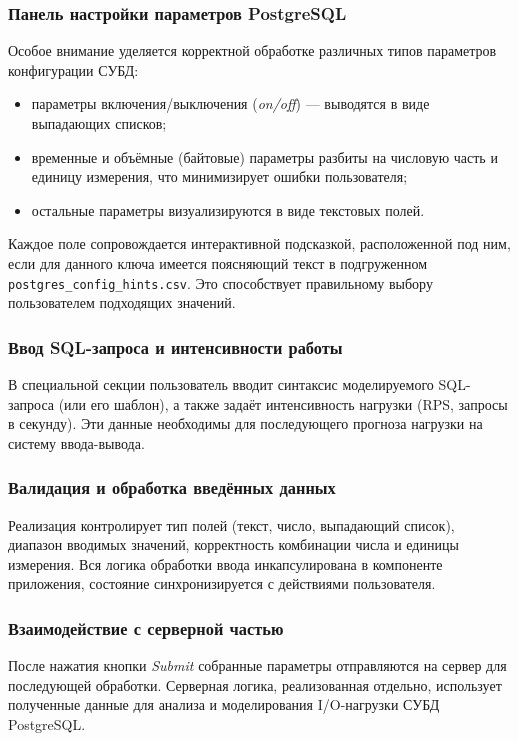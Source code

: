 \subsubsection{Панель настройки параметров PostgreSQL}

Особое внимание уделяется корректной обработке различных типов параметров конфигурации СУБД:
\begin{itemize}
    \item параметры включения/выключения (\emph{on/off}) --- выводятся в виде выпадающих списков;
    \item временные и объёмные (байтовые) параметры разбиты на числовую часть и единицу измерения, что минимизирует ошибки пользователя;
    \item остальные параметры визуализируются в виде текстовых полей.
\end{itemize}

Каждое поле сопровождается интерактивной подсказкой, расположенной под ним, если для данного ключа имеется поясняющий текст в подгруженном \texttt{postgres\_config\_hints.csv}. Это способствует правильному выбору пользователем подходящих значений.

\subsubsection{Ввод SQL-запроса и интенсивности работы}

В специальной секции пользователь вводит синтаксис моделируемого SQL-запроса (или его шаблон), а также задаёт интенсивность нагрузки (RPS, запросы в секунду). Эти данные необходимы для последующего прогноза нагрузки на систему ввода-вывода.

\subsubsection{Валидация и обработка введённых данных}

Реализация контролирует тип полей (текст, число, выпадающий список), диапазон вводимых значений, корректность комбинации числа и единицы измерения. Вся логика обработки ввода инкапсулирована в компоненте приложения, состояние синхронизируется с действиями пользователя.

\subsubsection{Взаимодействие с серверной частью}

После нажатия кнопки \emph{Submit} собранные параметры отправляются на сервер для последующей обработки. Серверная логика, реализованная отдельно, использует полученные данные для анализа и моделирования I/O-нагрузки СУБД PostgreSQL.

